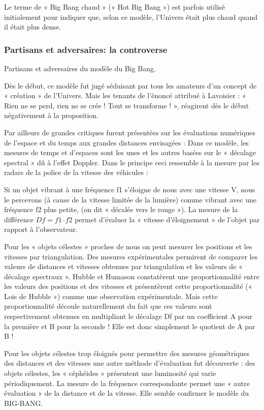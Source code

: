 \documentclass[a4paper,12pt]{article}
\begin{document}
Le terme de « Big Bang chaud » (« Hot Big Bang ») est parfois utilisé initialement pour indiquer que, selon ce modèle, l’Univers était plus chaud quand il était plus dense.

\subsubsection{Partisans et adversaires: la controverse}

Partisans et adversaires du modèle du Big Bang.

Dès le début, ce modèle fut jugé séduisant par tous les amateurs d'un concept de « création » de l'Univers. Mais les tenants de l'énoncé attribué à Lavoisier : « Rien ne se perd, rien ne se crée ! Tout se transforme ! », réagirent dès le début négativement à la proposition. 

Par ailleurs de grandes critiques furent présentées sur les évaluations numériques de l'espace et du temps aux grandes distances envisagées : Dans ce modèle, les mesures de temps et d'espaces sont les unes et les autres basées sur le « décalage spectral » dû à l'effet Doppler. Dans le principe ceci ressemble à la mesure par les radars de la police de la vitesse des véhicules : 

Si un objet vibrant à une fréquence f1 s'éloigne de nous avec une vitesse V, nous le percevons (à cause de la vitesse limitée de la lumière) comme vibrant avec une fréquence f2 plus petite, (on dit «  décalée vers le rouge »). La mesure de la différence $Df = f1 – f2$ permet d'évaluer la « vitesse d'éloignement » de l'objet par rapport à l'observateur. 

Pour les « objets célestes » proches de nous on peut mesurer les positions et les vitesses par triangulation. Des mesures expérimentales permirent de comparer les valeurs de distances et vitesses obtenues par triangulation et les valeurs de «  décalage spectraux ». Hubble et Humason constatèrent une proportionnalité entre les valeurs des positions et des vitesses et présentèrent cette proportionnalité (« Lois de Hubble ») comme une observation expérimentale. Mais cette proportionnalité découle naturellement du fait que ces valeurs sont respectivement obtenues en multipliant le décalage Df par un coefficient A pour la première et B pour la seconde ! Elle est donc simplement le quotient de A par B !

Pour les objets célestes trop éloignés pour permettre des mesures géométriques des distances et des vitesses une autre méthode d'évaluation fut découverte : des objets célestes, les « céphéides » présentent une luminosité qui varie périodiquement. La mesure de la fréquence correspondante permet une « autre évaluation » de la distance et de la vitesse. Elle semble confirmer le modèle du BIG-BANG.
\end{document}
